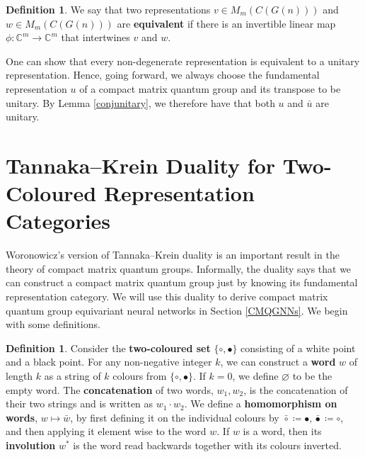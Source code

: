 \documentclass{article}
\theoremstyle{plain}
\theoremstyle{definition}
\newtheorem{definition}[theorem]{Definition}
\theoremstyle{remark}
\begin{document}
\begin{definition}
	We say that two representations 
	$v \in M_m(C(G(n)))$ and $w \in M_m(C(G(n)))$
	are \textbf{equivalent} if there is an
	invertible linear map 
	$\phi: \mathbb{C}^m \rightarrow \mathbb{C}^m$
	that intertwines $v$ and $w$.
\end{definition}

One can show 
\citep[Proposition 2.2.3]{gromada2020}
that every non-degenerate representation is equivalent to a unitary representation.
Hence, going forward, we always choose 
the fundamental representation $u$ of a compact matrix quantum group 
and its transpose to be unitary.
By Lemma \ref{conjunitary}, we therefore have that both $u$ and $\bar{u}$ are unitary.



\section{Tannaka--Krein Duality for Two-Coloured Representation Categories} 
\label{tannakakreinsection}

Woronowicz's version of
Tannaka--Krein duality 
is an important result in the theory of compact matrix quantum groups.
Informally, the duality says that we can construct a compact matrix quantum group 
just by knowing its fundamental representation category.
We will use this duality to derive compact matrix quantum group equivariant neural networks
in Section \ref{CMQGNNs}.
We begin with some definitions.

\begin{definition} \label{twocolouredset}
	Consider the \textbf{two-coloured set}
	$\{\circ, \bullet\}$ 
	consisting of a white point and a black point.
	For any non-negative integer $k$,
	we can construct a \textbf{word} $w$ of length $k$ 
	as a string of $k$ colours from
	$\{\circ, \bullet\}$. 
	If $k = 0$, we define $\varnothing$ to be the empty word.
	The \textbf{concatenation} of two words, $w_1, w_2$, is the concatenation of their two strings and is written as $w_1 \cdot w_2$.
	We define a \textbf{homomorphism on words}, $w \mapsto \bar{w}$, by first defining it on the individual colours by
	$\bar{\circ} \coloneqq \bullet, \bar{\bullet} \coloneqq \circ$,
	and then applying it element wise to the word $w$.
	If $w$ is a word, then 
	its \textbf{involution} $w^{*}$ is the word read backwards together with its colours inverted.
\end{definition}
\end{document}
